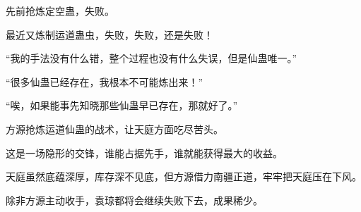 \begin{this_body}
先前抢炼定空蛊，失败。

最近又炼制运道蛊虫，失败，失败，还是失败！

“我的手法没有什么错，整个过程也没有什么失误，但是仙蛊唯一。”

“很多仙蛊已经存在，我根本不可能炼出来！”

“唉，如果能事先知晓那些仙蛊早已存在，那就好了。”

方源抢炼运道仙蛊的战术，让天庭方面吃尽苦头。

这是一场隐形的交锋，谁能占据先手，谁就能获得最大的收益。

天庭虽然底蕴深厚，库存深不见底，但方源借力南疆正道，牢牢把天庭压在下风。

除非方源主动收手，袁琼都将会继续失败下去，成果稀少。

\end{this_body}

